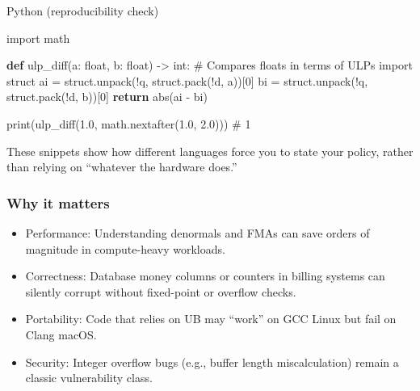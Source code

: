 \documentclass[
  letterpaper,
  DIV=11,
  numbers=noendperiod]{scrreprt}
\newenvironment{Shaded}{\begin{snugshade}}{\end{snugshade}}
\newcommand{\BuiltInTok}[1]{\textcolor[rgb]{0.00,0.23,0.31}{#1}}
\newcommand{\CommentTok}[1]{\textcolor[rgb]{0.37,0.37,0.37}{#1}}
\newcommand{\ControlFlowTok}[1]{\textcolor[rgb]{0.00,0.23,0.31}{\textbf{#1}}}
\newcommand{\DecValTok}[1]{\textcolor[rgb]{0.68,0.00,0.00}{#1}}
\newcommand{\FloatTok}[1]{\textcolor[rgb]{0.68,0.00,0.00}{#1}}
\newcommand{\ImportTok}[1]{\textcolor[rgb]{0.00,0.46,0.62}{#1}}
\newcommand{\KeywordTok}[1]{\textcolor[rgb]{0.00,0.23,0.31}{\textbf{#1}}}
\newcommand{\NormalTok}[1]{\textcolor[rgb]{0.00,0.23,0.31}{#1}}
\newcommand{\OperatorTok}[1]{\textcolor[rgb]{0.37,0.37,0.37}{#1}}
\newcommand{\StringTok}[1]{\textcolor[rgb]{0.13,0.47,0.30}{#1}}
\providecommand{\tightlist}{%
  \setlength{\itemsep}{0pt}\setlength{\parskip}{0pt}}
\begin{document}
Python (reproducibility check)

\begin{Shaded}
\begin{Highlighting}[]
\ImportTok{import}\NormalTok{ math}

\KeywordTok{def}\NormalTok{ ulp\_diff(a: }\BuiltInTok{float}\NormalTok{, b: }\BuiltInTok{float}\NormalTok{) }\OperatorTok{{-}\textgreater{}} \BuiltInTok{int}\NormalTok{:}
    \CommentTok{\# Compares floats in terms of ULPs}
    \ImportTok{import}\NormalTok{ struct}
\NormalTok{    ai }\OperatorTok{=}\NormalTok{ struct.unpack(}\StringTok{\textquotesingle{}!q\textquotesingle{}}\NormalTok{, struct.pack(}\StringTok{\textquotesingle{}!d\textquotesingle{}}\NormalTok{, a))[}\DecValTok{0}\NormalTok{]}
\NormalTok{    bi }\OperatorTok{=}\NormalTok{ struct.unpack(}\StringTok{\textquotesingle{}!q\textquotesingle{}}\NormalTok{, struct.pack(}\StringTok{\textquotesingle{}!d\textquotesingle{}}\NormalTok{, b))[}\DecValTok{0}\NormalTok{]}
    \ControlFlowTok{return} \BuiltInTok{abs}\NormalTok{(ai }\OperatorTok{{-}}\NormalTok{ bi)}

\BuiltInTok{print}\NormalTok{(ulp\_diff(}\FloatTok{1.0}\NormalTok{, math.nextafter(}\FloatTok{1.0}\NormalTok{, }\FloatTok{2.0}\NormalTok{)))  }\CommentTok{\# 1}
\end{Highlighting}
\end{Shaded}

These snippets show how different languages force you to state your
policy, rather than relying on ``whatever the hardware does.''

\subsubsection{Why it matters}\label{why-it-matters-11}

\begin{itemize}
\tightlist
\item
  Performance: Understanding denormals and FMAs can save orders of
  magnitude in compute-heavy workloads.
\item
  Correctness: Database money columns or counters in billing systems can
  silently corrupt without fixed-point or overflow checks.
\item
  Portability: Code that relies on UB may ``work'' on GCC Linux but fail
  on Clang macOS.
\item
  Security: Integer overflow bugs (e.g., buffer length miscalculation)
  remain a classic vulnerability class.
\end{itemize}
\end{document}
